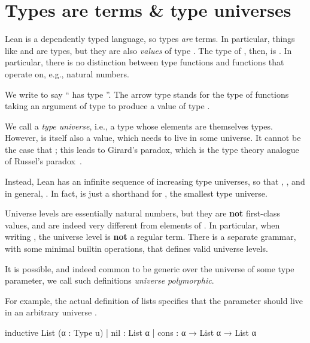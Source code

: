 \section{Types are terms \& type universes}
Lean is a dependently typed language, so types \emph{are} terms. 
In particular, things like  and  are types, but they are also \emph{values} of type \Type{}.
The type of , then, is .
In particular, there is no distinction between type functions and functions that operate on, e.g., natural numbers.


\begin{remark}
    We write  to say `` has type ''.
    The arrow type  stands for the type of functions taking an argument of type 
    to produce a value of type .
\end{remark}

We call \Type{} a \emph{type universe}, i.e., a type whose elements are themselves types. However, \Type{} is itself also a value, which needs to live in some universe.
It cannot be the case that ; this leads to Girard's paradox, which is the type theory analogue of Russel's paradox~\cite{girardInterpretationFonctionelleElimination1972}.

Instead, Lean has an infinite sequence of increasing type universes, so that , , and in general, . In fact,  is just a shorthand for , the smallest type universe.

Universe levels  are essentially natural numbers, but they are \textbf{not} first-class values, and are indeed very different from elements of .
In particular, when writing , the universe level  is \textbf{not} a regular term. There is a separate grammar, with some minimal builtin operations, that defines valid universe levels.

It is possible, and indeed common to be generic over the universe of some type parameter, we call such 
definitions \emph{universe polymorphic}.

For example, the actual definition of lists specifies that the parameter  should live in an arbitrary universe .
\begin{leancode}
  inductive List (α : Type u)
    | nil  : List α
    | cons : α → List α → List α
\end{leancode}

